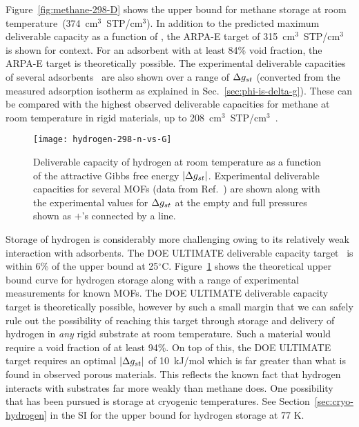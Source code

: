 Figure~\ref{fig:methane-298-D} shows the upper bound for methane storage at
room temperature~(374~cm$^3$~STP/cm$^3$). In addition to the predicted maximum
deliverable capacity as a function of \gst, the ARPA-E target of
315~cm$^3$~STP/cm$^3$~\cite{arpaemove} is shown for context. For an adsorbent
with at least 84\% void fraction, the ARPA-E target is theoretically possible.
The experimental deliverable capacities of several
adsorbents~\cite{mason2014evaluating} are also shown over a range of $\Delta g_{st}$
(converted from the measured adsorption isotherm as explained in
Sec.~\ref{sec:phi-is-delta-g}). These can be compared with the highest observed
deliverable capacities for methane at room temperature in rigid materials, up
to 208~cm$^3$~STP/cm$^3$~\cite{simon2015materials}.

\begin{figure}
    \centering
    \texttt{[image: hydrogen-298-n-vs-G]}
    \caption{Deliverable capacity of hydrogen at room temperature as a function of the attractive Gibbs free energy $|\Delta g_{st}|$.  Experimental deliverable capacities for several MOFs (data from Ref.~\cite{mason2014evaluating, garcia2018benchmark}) are shown along with the experimental values for $\Delta g_{st}$ at the empty and full pressures shown as $+$'s connected by a line.}
    \label{fig:hydrogen-298-D}
\end{figure}

Storage of hydrogen is considerably more challenging owing to its relatively
weak interaction with adsorbents. The DOE ULTIMATE deliverable capacity
target~\cite{DOE} is within 6\% of the upper bound at 25$^\circ$C.
Figure~\ref{fig:hydrogen-298-D} shows the theoretical upper bound curve for
hydrogen storage along with a range of experimental measurements for known
MOFs. The DOE ULTIMATE deliverable capacity target is theoretically possible,
however by such a small margin that we can safely rule out the possibility of
reaching this target through storage and delivery of hydrogen in \emph{any}
rigid substrate at room temperature. Such a material would require a void
fraction of at least 94\%. On top of this, the DOE ULTIMATE target requires an
optimal $|\Delta g_{st}|$ of 10~kJ/mol which is far greater than what is found in
observed porous materials. This reflects the known fact that hydrogen interacts
with substrates far more weakly than methane does. One possibility that has
been pursued is storage at cryogenic temperatures. See
Section~\ref{sec:cryo-hydrogen} in the SI for the upper bound for hydrogen
storage at 77 K.

